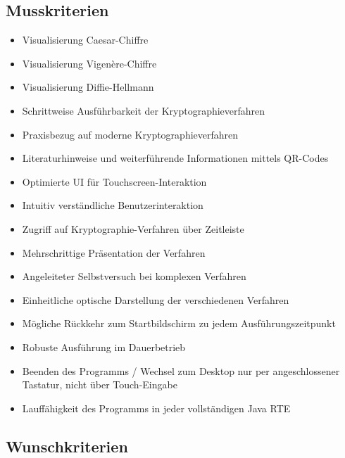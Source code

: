 \documentclass{article}
\begin{document}
\subsection{Musskriterien}

\begin{itemize}
    \item Visualisierung Caesar-Chiffre
    \item Visualisierung Vigenère-Chiffre
    \item Visualisierung Diffie-Hellmann
    \item Schrittweise Ausführbarkeit der Kryptographieverfahren
    \item Praxisbezug auf moderne Kryptographieverfahren
    \item Literaturhinweise und weiterführende Informationen mittels QR-Codes
    \item Optimierte \gls{UI} für Touchscreen-Interaktion
    \item Intuitiv verständliche Benutzerinteraktion
    \item Zugriff auf Kryptographie-Verfahren über Zeitleiste
    \item Mehrschrittige Präsentation der Verfahren
    \item Angeleiteter Selbstversuch bei komplexen Verfahren
    \item Einheitliche optische Darstellung der verschiedenen Verfahren
    \item Mögliche Rückkehr zum Startbildschirm zu jedem Ausführungszeitpunkt
    \item Robuste Ausführung im Dauerbetrieb
    \item Beenden des Programms / Wechsel zum Desktop nur per angeschlossener Tastatur, nicht über Touch-Eingabe
    \item Lauffähigkeit des Programms in jeder vollständigen Java RTE
\end{itemize}

\subsection{Wunschkriterien}
\end{document}
